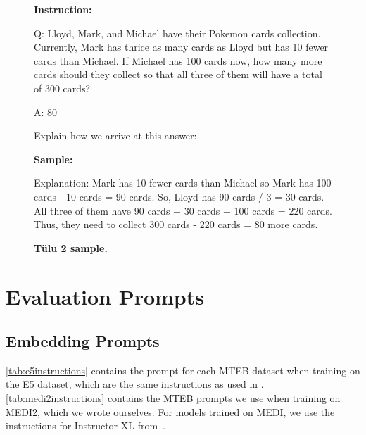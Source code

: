 \documentclass{article}
\newcommand{\tulu}{T\"ulu}
\begin{document}
\begin{figure}[htbp]
\hrulefill

\textbf{Instruction:}

\hrulefill

Q: Lloyd, Mark, and Michael have their Pokemon cards collection. Currently, Mark has thrice as many cards as Lloyd but has 10 fewer cards than Michael. If Michael has 100 cards now, how many more cards should they collect so that all three of them will have a total of 300 cards?

A: 80

Explain how we arrive at this answer: 

\hrulefill

\textbf{Sample:}

\hrulefill

Explanation: Mark has 10 fewer cards than Michael so Mark has 100 cards - 10 cards = 90 cards. So, Lloyd has 90 cards / 3 = 30 cards. All three of them have 90 cards + 30 cards + 100 cards = 220 cards. Thus, they need to collect 300 cards - 220 cards = 80 more cards.

\hrulefill

\caption{\textbf{\tulu{} 2 sample.}}
\label{fig:tulu2}
\end{figure}

\FloatBarrier


\section{Evaluation Prompts}
\label{sec:prompts}

\subsection{Embedding Prompts}
\label{sec:promptsemb}

\autoref{tab:e5instructions} contains the prompt for each MTEB dataset when training on the E5 dataset, which are the same instructions as used in \citet{wang2024improving}. \autoref{tab:medi2instructions} contains the MTEB prompts we use when training on MEDI2, which we wrote ourselves. For models trained on MEDI, we use the instructions for Instructor-XL from~\citet{su2023embedder}.
\end{document}
